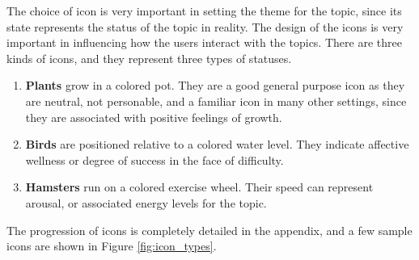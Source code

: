       The choice of icon is very important in setting
      the theme for the topic, since its state represents the status of the topic
      in reality.
      The design of the icons is very important in influencing how
      the users interact with the topics. 
      There are three kinds of icons, and they represent three types of statuses.
      \begin{enumerate}
      \item \textbf{Plants} grow in a colored pot. They are a good general purpose icon as they are neutral,
      not personable, and a familiar icon in many other settings,
      since they are associated with positive feelings of growth.
      \item \textbf{Birds} are positioned relative to a colored water level.
      They indicate affective wellness or degree of success in the face of difficulty.
      \item \textbf{Hamsters} run on a colored exercise wheel.
      Their speed can represent arousal,
      or associated energy levels for the topic.
      \end{enumerate}
      The progression of icons is completely detailed in the appendix,
      and a few sample icons are shown in Figure \ref{fig:icon_types}.

